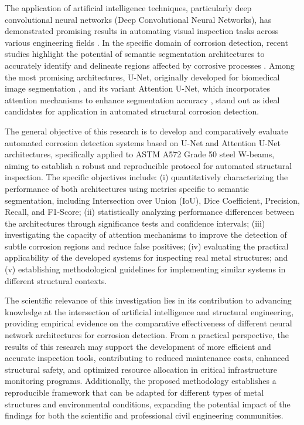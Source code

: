 \documentclass[12pt,a4paper,twoside]{article}
\begin{document}
The application of artificial intelligence techniques, particularly deep convolutional neural networks (Deep Convolutional Neural Networks), has demonstrated promising results in automating visual inspection tasks across various engineering fields \cite{lecun2015deep, cha2017deep}. In the specific domain of corrosion detection, recent studies highlight the potential of semantic segmentation architectures to accurately identify and delineate regions affected by corrosive processes \cite{atha2018evaluation, forkan2022corodnet, nash2018automated}. Among the most promising architectures, U-Net, originally developed for biomedical image segmentation \cite{ronneberger2015u}, and its variant Attention U-Net, which incorporates attention mechanisms to enhance segmentation accuracy \cite{oktay2018attention}, stand out as ideal candidates for application in automated structural corrosion detection.

The general objective of this research is to develop and comparatively evaluate automated corrosion detection systems based on U-Net and Attention U-Net architectures, specifically applied to ASTM A572 Grade 50 steel W-beams, aiming to establish a robust and reproducible protocol for automated structural inspection. The specific objectives include: (i) quantitatively characterizing the performance of both architectures using metrics specific to semantic segmentation, including Intersection over Union (IoU), Dice Coefficient, Precision, Recall, and F1-Score; (ii) statistically analyzing performance differences between the architectures through significance tests and confidence intervals; (iii) investigating the capacity of attention mechanisms to improve the detection of subtle corrosion regions and reduce false positives; (iv) evaluating the practical applicability of the developed systems for inspecting real metal structures; and (v) establishing methodological guidelines for implementing similar systems in different structural contexts.

The scientific relevance of this investigation lies in its contribution to advancing knowledge at the intersection of artificial intelligence and structural engineering, providing empirical evidence on the comparative effectiveness of different neural network architectures for corrosion detection. From a practical perspective, the results of this research may support the development of more efficient and accurate inspection tools, contributing to reduced maintenance costs, enhanced structural safety, and optimized resource allocation in critical infrastructure monitoring programs. Additionally, the proposed methodology establishes a reproducible framework that can be adapted for different types of metal structures and environmental conditions, expanding the potential impact of the findings for both the scientific and professional civil engineering communities.
\end{document}
